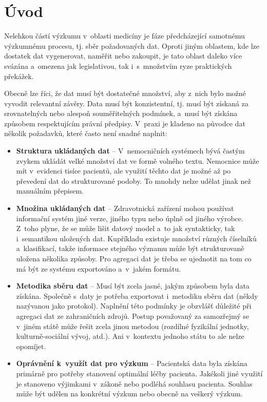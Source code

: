\documentclass[11pt, final, oneside]{fithesis2}
\newcommand{\polozka}[1]{\item {\bf #1}\xspace}
\begin{document}
\MainMatter

\tableofcontents

\chapter{Úvod}

Nelehkou částí výzkumu v~oblasti medicíny je fáze předcházející samotnému výzkumnému procesu, tj. sběr požadovaných dat. Oproti jiným oblastem, kde lze dostatek dat vygenerovat, naměřit nebo zakoupit, je tato oblast daleko více svázána a~omezena jak legislativou, tak i~s~množstvím ryze praktických překážek.

Obecně lze říci, že dat musí být dostatečné množství, aby z~nich bylo možné vyvodit relevantní závěry. Data musí být konzistentní, tj. musí být získaná za srovnatelných nebo alespoň souměřitelných podmínek, a~musí být získána způsobem respektujícím právní předpisy. V~praxi je kladeno na původce dat několik požadavků, které často není snadné naplnit:

\begin{itemize}
\polozka{Struktura ukládaných dat} -- V~nemocničních systémech bývá častým zvykem ukládát velké množství dat ve formě volného textu. Nemocnice může mít v~evidenci tisíce pacientů, ale využití těchto dat je možné až po převedení dat do strukturované podoby. To mnohdy nelze udělat jinak než manuálním přepisem.
	
	\polozka{Množina ukládaných dat} -- Zdravotnická zařízení mohou používat informační systém jiné verze, jiného typu nebo úplně od jiného výrobce. Z~toho plyne, že se může lišit datový model a~to jak syntakticky, tak i~semantikou uložených dat. Kupříkladu existuje množství různých číselníků a~klasifikací, takže informace stejného významu může být strukturovaně uložena několika způsoby. Pro agregaci dat je třeba se ujednotit na tom co má být ze systému exportováno a~v~jakém formátu. 
		
	\polozka{Metodika sběru dat} -- Musí být zcela jasné, jakým způsobem byla data získána. Společně s~daty je potřeba exportovat i~metodiku sběru dat (někdy nazývanou jako protokol). Naplnění této podmínky je obzvlášť důležité při agregaci dat ze zahraničních zdrojů. Postup považovaný za samozřejmý se v~jiném státě může řešit zcela jinou metodou (rozdílné fyzikální jednotky, kulturně-sociální vývoj, atd.). Ani v~kontextu jednoho státu to ale nelze opomíjet. 
	
	\polozka{Oprávnění k~využít dat pro výzkum} -- Pacientská data byla získána primárně pro potřeby stanovení optimální léčby pacienta. Jakékoli jiné využití je stanoveno výjimkami v~zákoně nebo podléhá souhlasu pacienta. Souhlas může být udělen na konkrétní výzkum nebo obecně na veškerý výzkum.
\end{itemize}
\end{document}
